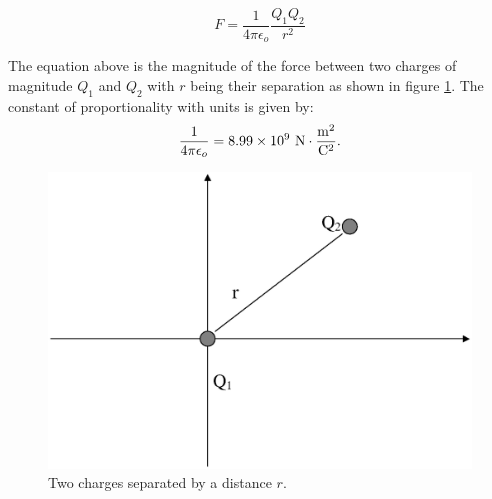 \begin{equation}
F=\frac{1}{4\pi\epsilon_o}\frac{Q_1Q_2}{r^2} \label{CL}
\end{equation}

The equation above is the magnitude of the force between
two charges of magnitude $Q_1$ and $Q_2$ with $r$ being their
separation as shown in figure \ref{fig:electro:es1}.  The constant of
proportionality with units is given by:
\begin{eqnarray*}
\frac{1}{4\pi\epsilon_o}=8.99\times 10^9 ~{\rm N \cdot
\frac{m^2}{C^2}}.
\end{eqnarray*}

\begin{figure}[!htb]
\centering
\epsfxsize=6cm \includegraphics[scale=0.4]{1_electro/es1.eps}
\caption{Two charges separated by a distance $r$.}
\label{fig:electro:es1}
\end{figure}

